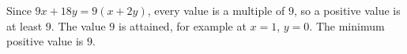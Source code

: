 Since $9x+18y=9(x+2y)$, every value is a multiple of $9$, so a positive value is at least $9$. The value $9$ is attained, for example at $x=1$, $y=0$. The minimum positive value is $\boxed{9}$.

